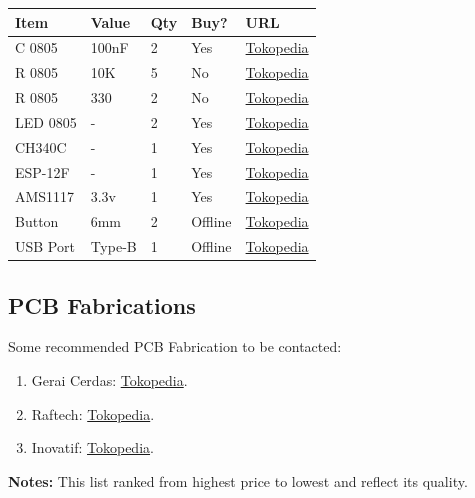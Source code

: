 \documentclass[a4paper,12pt,oneside,pdflatex,italian,final,twocolumn]{article}
\begin{document}
	\begin{table}[!ht]
		\centering
		\begin{tabular}{|l|l|l|l|l|}
			\hline
			Item & Value & Qty & Buy? & URL \\
			\hline
			C 0805 & 100nF & 2 & Yes & \href{https://www.tokopedia.com/ndtechnology/kapasitor-capacitor-smd-0805-100nf-bijian-pcs}{Tokopedia} \\
			R 0805 & 10K & 5 & No & \href{https://www.tokopedia.com/wiksatech/resistor-10k-5-0805-284b}{Tokopedia} \\
			R 0805 & 330 & 2 & No & \href{https://www.tokopedia.com/isee/resistor-smd-0805-330ohm-330-ohm-toleransi-1-tolerance-1}{Tokopedia} \\
			LED 0805 & - & 2 & Yes & \href{https://www.tokopedia.com/wkh-elektronik/led-smd-0805-white-color-warna-putih-smt}{Tokopedia} \\
			CH340C & - & 1 & Yes & \href{https://www.tokopedia.com/celectro/ic-ch340c-smd}{Tokopedia} \\
			ESP-12F & - & 1 & Yes & \href{https://www.tokopedia.com/cncstorebandung/cnc-esp8266-esp-12f-esp12f-esp-12-esp12-wifi-serial-transceiver}{Tokopedia} \\
			AMS1117 & 3.3v & 1 & Yes & \href{https://www.tokopedia.com/isee/ams1117-3-3v-smd-regulator-sot-223}{Tokopedia} \\
			Button & 6mm & 2 & Offline & \href{https://www.tokopedia.com/eltech-online/6x6x5h-height-tinggi-5mm-tact-switch-saklar-omten-ts-6650}{Tokopedia} \\
			USB Port & Type-B & 1 & Offline & \href{https://www.tokopedia.com/eltech-online/usb-b-pcb-female-right-angle-siku-bengkok}{Tokopedia} \\
			\hline
		\end{tabular}
	\end{table}

	\subsection{PCB Fabrications}
	
	Some recommended PCB Fabrication to be contacted:
	\begin{enumerate}
		\item Gerai Cerdas: \href{https://www.tokopedia.com/geraicerdas/cetak-pcb-1-keping-single-double-layer-rapid-prototyping-satuan}{Tokopedia}.
		
		\item Raftech: \href{https://www.tokopedia.com/raftech/jasa-cetak-pcb-double-layer-fr4-full-masking-jalur-masking-silkscreen}{Tokopedia}.
		
		\item Inovatif: \href{https://www.tokopedia.com/inovatif/cetak-pcb-satuan-dan-desain-pcb-masking}{Tokopedia}.
	\end{enumerate}

	\textbf{Notes:} This list ranked from highest price to lowest and reflect its quality.
	
\end{document}
